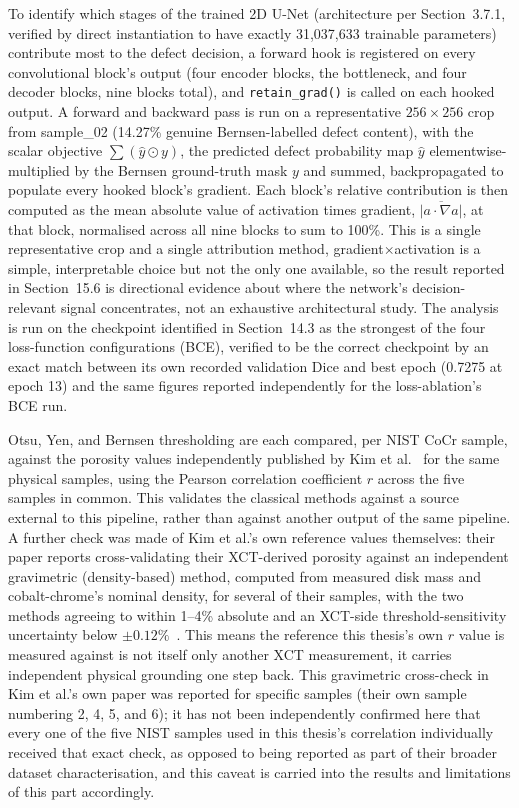 To identify which stages of the trained 2D U-Net (architecture per Section~3.7.1, verified by direct
instantiation to have exactly 31,037,633 trainable parameters) contribute most to the defect decision,
a forward hook is registered on every convolutional block's output (four encoder blocks, the
bottleneck, and four decoder blocks, nine blocks total), and \texttt{retain\_grad()} is called on each
hooked output. A forward and backward pass is run on a representative $256\times256$ crop from
sample\_02 (14.27\% genuine Bernsen-labelled defect content), with the scalar objective
$\sum(\hat{y} \odot y)$, the predicted defect probability map $\hat{y}$ elementwise-multiplied by the
Bernsen ground-truth mask $y$ and summed, backpropagated to populate every hooked block's gradient.
Each block's relative contribution is then computed as the mean absolute value of activation times
gradient, $\overline{|a \cdot \nabla a|}$, at that block, normalised across all nine blocks to sum to
100\%. This is a single representative crop and a single attribution method, gradient$\times$activation
is a simple, interpretable choice but not the only one available, so the result reported in
Section~15.6 is directional evidence about where the network's decision-relevant signal concentrates,
not an exhaustive architectural study. The analysis is run on the checkpoint identified in
Section~14.3 as the strongest of the four loss-function configurations (BCE), verified to be the
correct checkpoint by an exact match between its own recorded validation Dice and best epoch
(0.7275 at epoch 13) and the same figures reported independently for the loss-ablation's BCE run.

Otsu, Yen, and Bernsen thresholding are each compared, per NIST CoCr sample, against the porosity
values independently published by Kim et al.~\citep{Kim2017} for the same physical samples, using the
Pearson correlation coefficient $r$ across the five samples in common. This validates the classical
methods against a source external to this pipeline, rather than against another output of the same
pipeline. A further check was made of Kim et al.'s own reference values themselves: their paper
reports cross-validating their XCT-derived porosity against an independent gravimetric (density-based)
method, computed from measured disk mass and cobalt-chrome's nominal density, for several of their
samples, with the two methods agreeing to within 1--4\% absolute and an XCT-side threshold-sensitivity
uncertainty below $\pm 0.12\%$~\citep{Kim2017}. This means the reference this thesis's own $r$ value is
measured against is not itself only another XCT measurement, it carries independent physical grounding
one step back. This gravimetric cross-check in Kim et al.'s own paper was reported for specific samples
(their own sample numbering 2, 4, 5, and 6); it has not been independently confirmed here that every
one of the five NIST samples used in this thesis's correlation individually received that exact check,
as opposed to being reported as part of their broader dataset characterisation, and this caveat is
carried into the results and limitations of this part accordingly.

